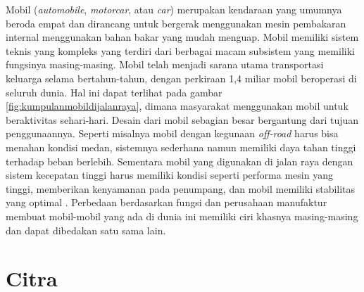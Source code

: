 Mobil (\emph{automobile}, \emph{motorcar}, atau \emph{car}) merupakan kendaraan yang umumnya beroda empat dan dirancang untuk bergerak 
menggunakan mesin pembakaran internal menggunakan bahan bakar yang mudah menguap. Mobil memiliki sistem teknis yang 
kompleks yang terdiri dari berbagai macam subsistem yang memiliki fungsinya masing-masing. Mobil telah menjadi sarana 
utama transportasi keluarga selama bertahun-tahun, dengan perkiraan 1,4 miliar mobil beroperasi di seluruh dunia. Hal ini 
dapat terlihat pada gambar \ref{fig:kumpulanmobildijalanraya}, dimana masyarakat menggunakan mobil untuk beraktivitas sehari-hari. 
Desain dari mobil sebagian besar bergantung dari tujuan penggunaannya. Seperti misalnya mobil dengan kegunaan \emph{off-road} 
harus bisa menahan kondisi medan, sistemnya sederhana namun memiliki daya tahan tinggi terhadap beban berlebih. Sementara mobil 
yang digunakan di jalan raya dengan sistem kecepatan tinggi harus memiliki kondisi seperti performa mesin yang tinggi, 
memberikan kenyamanan pada penumpang, dan mobil memiliki stabilitas yang optimal \parencite{Cromer2023}. Perbedaan 
berdasarkan fungsi dan perusahaan manufaktur membuat mobil-mobil yang ada di dunia ini memiliki ciri khasnya masing-masing 
dan dapat dibedakan satu sama lain.


\section{Citra}
\label{sec:citra}

